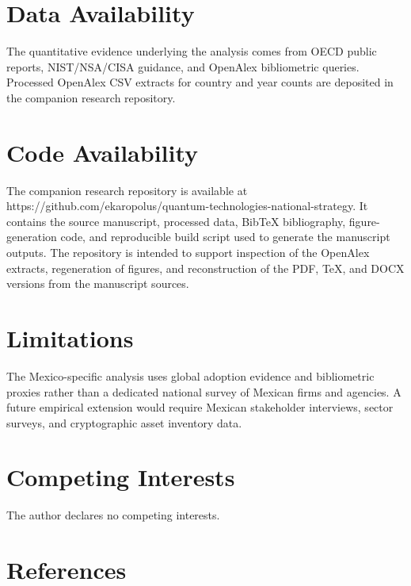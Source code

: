 \documentclass[
  11pt,
  letterpaper,
]{article}
\begin{document}
\section{Data Availability}\label{data-availability}

The quantitative evidence underlying the analysis comes from OECD public
reports, NIST/NSA/CISA guidance, and OpenAlex bibliometric queries.
Processed OpenAlex CSV extracts for country and year counts are
deposited in the companion research repository.

\section{Code Availability}\label{code-availability}

The companion research repository is available at
https://github.com/ekaropolus/quantum-technologies-national-strategy. It
contains the source manuscript, processed data, BibTeX bibliography,
figure-generation code, and reproducible build script used to generate
the manuscript outputs. The repository is intended to support inspection
of the OpenAlex extracts, regeneration of figures, and reconstruction of
the PDF, TeX, and DOCX versions from the manuscript sources.

\section{Limitations}\label{limitations}

The Mexico-specific analysis uses global adoption evidence and
bibliometric proxies rather than a dedicated national survey of Mexican
firms and agencies. A future empirical extension would require Mexican
stakeholder interviews, sector surveys, and cryptographic asset
inventory data.

\section{Competing Interests}\label{competing-interests}

The author declares no competing interests.

\section{References}\label{references}
\end{document}

